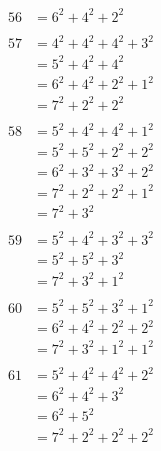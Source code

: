 \documentclass{article}
\numberwithin{equation}{section}
\begin{document}
\begin{multicols}{3}
\begin{align*}
56 & = 6^2 + 4^2 + 2^2\\
\\
57 & = 4^2 + 4^2 + 4^2 + 3^2\\
   & = 5^2 + 4^2 + 4^2\\
   & = 6^2 + 4^2 + 2^2 + 1^2\\
   & = 7^2 + 2^2 + 2^2\\
\\
58 & = 5^2 + 4^2 + 4^2 + 1^2\\
   & = 5^2 + 5^2 + 2^2 + 2^2\\
   & = 6^2 + 3^2 + 3^2 + 2^2\\
   & = 7^2 + 2^2 + 2^2 + 1^2\\
   & = 7^2 + 3^2\\
\\
59 & = 5^2 + 4^2 + 3^2 + 3^2\\
   & = 5^2 + 5^2 + 3^2\\
   & = 7^2 + 3^2 + 1^2\\
\\
60 & = 5^2 + 5^2 + 3^2 + 1^2\\
   & = 6^2 + 4^2 + 2^2 + 2^2\\
   & = 7^2 + 3^2 + 1^2 + 1^2\\
\\
61 & = 5^2 + 4^2 + 4^2 + 2^2\\
   & = 6^2 + 4^2 + 3^2\\
   & = 6^2 + 5^2\\
   & = 7^2 + 2^2 + 2^2 + 2^2\\
\end{align*}
\end{multicols}

\pagebreak
\end{document}
